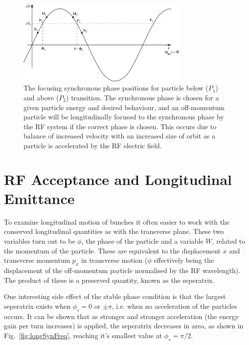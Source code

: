 \begin{figure}
\begin{center}
\includegraphics[width=0.75\textwidth]{Appendices/figures/longStab.png}
\end{center}
\caption{The focusing synchronous phase positions for particle below ($P_{1}$) and above ($P_{2}$) transition. The synchronous phase is chosen for a given particle energy and desired behaviour, and an off-momentum particle will be longitudinally focused to the synchronous phase by the RF system if the correct phase is chosen. This occurs due to balance of increased velocity with an increased size of orbit as a particle is accelerated by the RF electric field.}
\label{fig:longPhase}
\end{figure}

\section{RF Acceptance and Longitudinal Emittance}

To examine longitudinal motion of bunches it often easier to work with the conserved longitudinal quantities as with the transverse plane. These two variables turn out to be $\phi$, the phase of the particle and a variable $W$, related to the momentum of the particle. These are equivalent to the displacement $x$ and transverse momentum $p_{x}$ in transverse motion ($\phi$ effectively being the displacement of the off-momentum particle normalised by the RF wavelength). The product of these is a preserved quantity, known as the seperatrix.

One interesting side effect of the stable phase condition is that the largest seperatrix exists when $\phi_{s}= 0$ or $\pm \pi$, i.e. when no acceleration of the particles occurs. It can be shown that as stronger and stronger acceleration (the energy gain per turn increases) is applied, the seperatrix decreases in area, as shown in Fig.~\ref{fig:longSynFreq}, reaching it's smallest value at $\phi_{s} = \pi / 2$.

